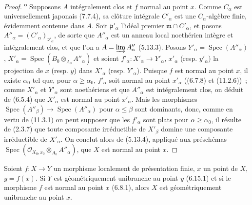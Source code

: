 \begin{proof}
\textsuperscript{o} Supposons $A$ intégralement clos et $f$ normal
au point $x$. Comme $C_\alpha$ est universellement japonais (7.7.4), sa
clôture intégrale $C'_\alpha$ est une $C_\alpha$-algèbre finie, évidemment
contenue dans $A$. Soit $\mathfrak p'_\alpha$ l'idéal premier
$\mathfrak m\cap C'_\alpha$, et posons
$A''_\alpha=(C'_\alpha)_{\mathfrak p'_\alpha}$, de sorte que $A''_\alpha$
est un anneau local noethérien intègre et intégralement clos, et que l'on a
$A=\varinjlim A''_\alpha$ (5.13.3). Posons
$Y'_\alpha=\operatorname{Spec}(A''_\alpha)$,
$X'_\alpha=\operatorname{Spec}(B_0\otimes_{A_0}A''_\alpha)$ et soient
$f'_\alpha:X'_\alpha\to Y'_\alpha$, $x'_\alpha$ (resp. $y'_\alpha$) la
projection de $x$ (resp. $y$) dans $X'_\alpha$ (resp. $Y'_\alpha$). Puisque
$f$ est normal au point $x$, il existe $\alpha_0$ tel que, pour
$\alpha\geq\alpha_0$, $f'_\alpha$ soit normal au point $x'_\alpha$ ((6.7.8)
et (11.2.6))~;
comme $X'_\alpha$ et $Y'_\alpha$ sont noethériens et que $A''_\alpha$ est
intégralement clos, on déduit de (6.5.4) que $X'_\alpha$ est normal au point
$x'_\alpha$. Mais les morphismes
$\operatorname{Spec}(A''_\beta)\to\operatorname{Spec}(A''_\alpha)$ pour
$\alpha\leq\beta$ sont dominants, donc, comme en vertu de (11.3.1) on peut
supposer que les $f'_\alpha$ sont plats pour $\alpha\geq\alpha_0$, il résulte
de (2.3.7) que toute composante irréductible de $X'_\beta$ domine une
composante irréductible de $X'_\alpha$. On conclut alors de (5.13.4), appliqué
aux préschémas
$\operatorname{Spec}(\mathcal O_{X_0,x_0}\otimes_{A_0}A''_\alpha)$,
que $X$ est normal au point $x$.
\end{proof}

\begin{corollary}[11.3.14]
\label{IV.11.3.14-fr}
Soient $f:X\to Y$ un morphisme localement de présentation finie, $x$ un point
de $X$, $y=f(x)$. Si $Y$ est géométriquement unibranche au point $y$ \textup{(6.15.1)}
et si le morphisme $f$ est normal au point $x$ \textup{(6.8.1)}, alors $X$ est
géométriquement unibranche au point $x$.
\end{corollary}

